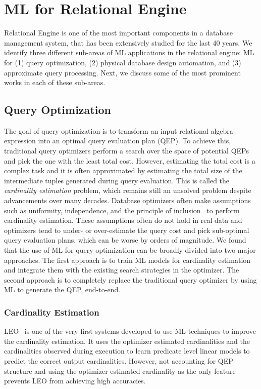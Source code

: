 \section{ML for Relational Engine}
Relational Engine is one of the most important components in a database management system,  that has been extensively studied for the last 40 years.
We identify three different sub-areas of ML applications in the relational engine: ML for (1) query optimization, (2) physical database design automation, and (3) approximate query processing.
Next, we discuss some of the most prominent works in each of these sub-areas.

\subsection{Query Optimization}
The goal of query optimization is to transform an input relational algebra expression into an optimal query evaluation plan (QEP).
To achieve this, traditional query optimizers perform a search over the space of potential QEPs and pick the one with the least total cost.
However, estimating the total cost is a complex task and it is often approximated by estimating the total size of the intermediate tuples generated during query evaluation.
This is called the \textit{cardinality estimation} problem, which remains still an unsolved problem despite advancements over many decades. 
Database optimizers often make assumptions such as uniformity, independence, and the principle of inclusion~\cite{leis2018query} to perform cardinality estimation.
These assumptions often do not hold in real data and optimizers tend to under- or over-estimate the query cost and pick sub-optimal query evaluation plans, which can be worse by orders of magnitude.
We found that the use of ML for query optimization can be broadly divided into two major approaches.
The first approach is to train ML models for cardinality estimation and integrate them with the existing search strategies in the optimizer.
The second approach is to completely replace the traditional query optimizer by using ML to generate the QEP, end-to-end.

\subsubsection{Cardinality Estimation}
LEO~\cite{leo} is one of the very first systems developed to use ML techniques to improve the cardinality estimation.
It uses the optimizer estimated cardinalities and the cardinalities observed during execution to learn predicate level linear models to predict the correct output cardinalities.
However, not accounting for QEP structure and using the optimizer estimated cardinality as the only feature prevents LEO from achieving high accuracies.

